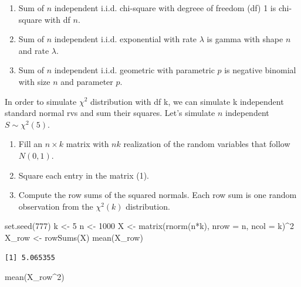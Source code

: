 \documentclass[
  letterpaper,
  DIV=11,
  numbers=noendperiod]{scrreprt}
\newenvironment{Shaded}{\begin{snugshade}}{\end{snugshade}}
\newcommand{\AttributeTok}[1]{\textcolor[rgb]{0.40,0.45,0.13}{#1}}
\newcommand{\DecValTok}[1]{\textcolor[rgb]{0.68,0.00,0.00}{#1}}
\newcommand{\FunctionTok}[1]{\textcolor[rgb]{0.28,0.35,0.67}{#1}}
\newcommand{\NormalTok}[1]{\textcolor[rgb]{0.00,0.23,0.31}{#1}}
\newcommand{\OtherTok}[1]{\textcolor[rgb]{0.00,0.23,0.31}{#1}}
\newcommand{\SpecialCharTok}[1]{\textcolor[rgb]{0.37,0.37,0.37}{#1}}
\begin{document}
\begin{enumerate}
\def\labelenumi{\arabic{enumi}.}
\item
  Sum of \(n\) independent i.i.d. chi-square with degreee of freedom
  (df) 1 is chi-square with df \(n\).
\item
  Sum of \(n\) independent i.i.d. exponential with rate \(\lambda\) is
  gamma with shape \(n\) and rate \(\lambda\).
\item
  Sum of \(n\) independent i.i.d. geometric with parametric \(p\) is
  negative binomial with size \(n\) and parameter \(p\).
\end{enumerate}

In order to simulate \(\chi^2\) distribution with df k, we can simulate
k independent standard normal rvs and sum their squares. Let's simulate
\(n\) independent \(S \sim \chi^2(5)\).

\begin{enumerate}
\def\labelenumi{\arabic{enumi}.}
\item
  Fill an \(n \times k\) matrix with \(n k\) realization of the random
  variables that follow \(N(0,1)\).
\item
  Square each entry in the matrix (1).
\item
  Compute the row sums of the squared normals. Each row sum is one
  random observation from the \(\chi^2(k)\) distribution.
\end{enumerate}

\begin{Shaded}
\begin{Highlighting}[]
\FunctionTok{set.seed}\NormalTok{(}\DecValTok{777}\NormalTok{)}
\NormalTok{k }\OtherTok{\textless{}{-}} \DecValTok{5}
\NormalTok{n }\OtherTok{\textless{}{-}} \DecValTok{1000}
\NormalTok{X }\OtherTok{\textless{}{-}} \FunctionTok{matrix}\NormalTok{(}\FunctionTok{rnorm}\NormalTok{(n}\SpecialCharTok{*}\NormalTok{k), }\AttributeTok{nrow =}\NormalTok{ n, }\AttributeTok{ncol =}\NormalTok{ k)}\SpecialCharTok{\^{}}\DecValTok{2}
\NormalTok{X\_row }\OtherTok{\textless{}{-}} \FunctionTok{rowSums}\NormalTok{(X)}
\FunctionTok{mean}\NormalTok{(X\_row)}
\end{Highlighting}
\end{Shaded}

\begin{verbatim}
[1] 5.065355
\end{verbatim}

\begin{Shaded}
\begin{Highlighting}[]
\FunctionTok{mean}\NormalTok{(X\_row}\SpecialCharTok{\^{}}\DecValTok{2}\NormalTok{)}
\end{Highlighting}
\end{Shaded}
\end{document}
